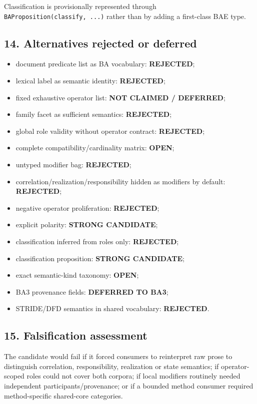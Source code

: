 \documentclass[
  10pt,
  letterpaper,
]{article}
\providecommand{\tightlist}{%
  \setlength{\itemsep}{0pt}\setlength{\parskip}{0pt}}
\begin{document}
Classification is provisionally represented through
\texttt{BAProposition(classify,\ ...)} rather than by adding a
first-class BAE type.

\subsection{14. Alternatives rejected or
deferred}\label{alternatives-rejected-or-deferred}

\begin{itemize}
\tightlist
\item
  document predicate list as BA vocabulary: \textbf{REJECTED};
\item
  lexical label as semantic identity: \textbf{REJECTED};
\item
  fixed exhaustive operator list: \textbf{NOT CLAIMED / DEFERRED};
\item
  family facet as sufficient semantics: \textbf{REJECTED};
\item
  global role validity without operator contract: \textbf{REJECTED};
\item
  complete compatibility/cardinality matrix: \textbf{OPEN};
\item
  untyped modifier bag: \textbf{REJECTED};
\item
  correlation/realization/responsibility hidden as modifiers by default:
  \textbf{REJECTED};
\item
  negative operator proliferation: \textbf{REJECTED};
\item
  explicit polarity: \textbf{STRONG CANDIDATE};
\item
  classification inferred from roles only: \textbf{REJECTED};
\item
  classification proposition: \textbf{STRONG CANDIDATE};
\item
  exact semantic-kind taxonomy: \textbf{OPEN};
\item
  BA3 provenance fields: \textbf{DEFERRED TO BA3};
\item
  STRIDE/DFD semantics in shared vocabulary: \textbf{REJECTED}.
\end{itemize}

\subsection{15. Falsification
assessment}\label{falsification-assessment}

The candidate would fail if it forced consumers to reinterpret raw prose
to distinguish correlation, responsibility, realization or state
semantics; if operator-scoped roles could not cover both corpora; if
local modifiers routinely needed independent participants/provenance; or
if a bounded method consumer required method-specific shared-core
categories.
\end{document}
